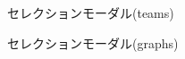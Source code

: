 \documentclass[sotsuron]{kuee}
\begin{document}
			\begin{figure}
				\begin{center}
				\end{center}
				\caption{セレクションモーダル(teams)}
		  		\label{fig:selection_teams}
			\end{figure}
			\begin{figure}
				\begin{center}
				\end{center}
				\caption{セレクションモーダル(graphs)}
		  		\label{fig:selection_graphs}
			\end{figure}
		
\end{document}
